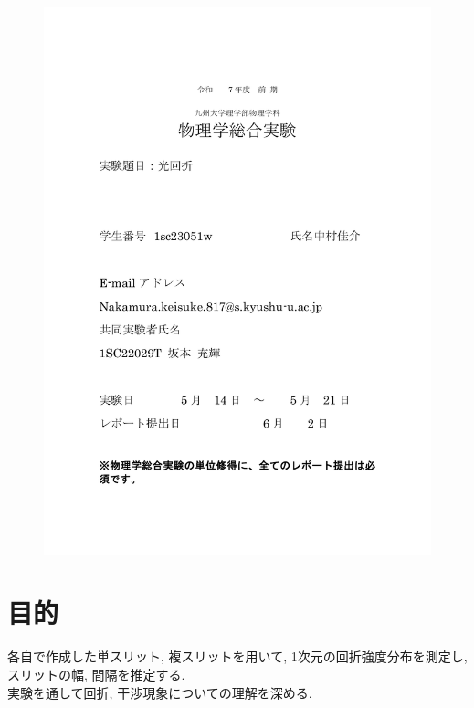 \documentclass[11pt]{ltjsarticle}
\begin{document}
\begin{figure}[H]
  \centering
  \includegraphics[width=0.98\columnwidth]{hyoushi.pdf}
\end{figure}
  \section*{目的}
    各自で作成した単スリット, 複スリットを用いて, 1次元の回折強度分布を測定し, スリットの幅, 間隔を推定する. \\
    実験を通して回折, 干渉現象についての理解を深める. \\
\end{document}
